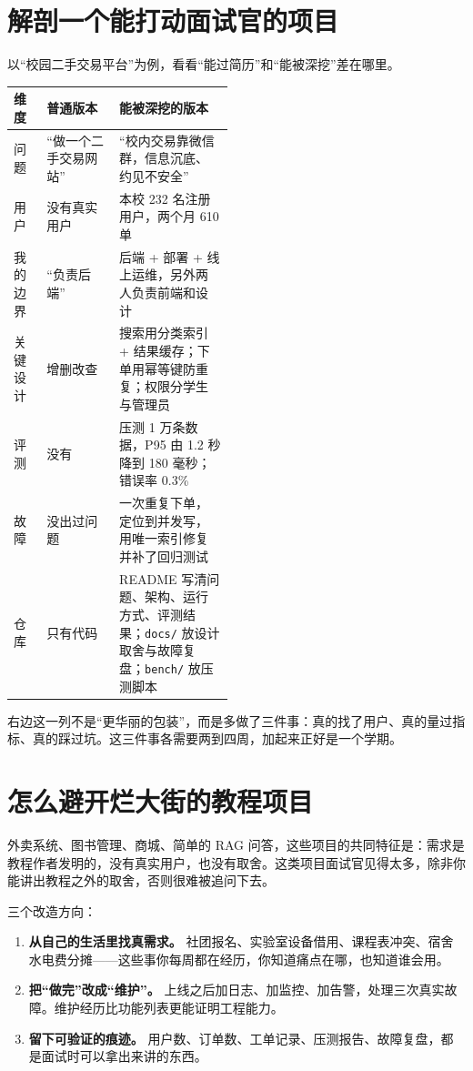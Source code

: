 \documentclass[UTF8,zihao=5,openany]{ctexbook}
\begin{document}
\section{解剖一个能打动面试官的项目}
以“校园二手交易平台”为例，看看“能过简历”和“能被深挖”差在哪里。

\begin{table}[htbp]
\centering\footnotesize
\begin{tabularx}{\linewidth}{p{0.15\linewidth}p{0.33\linewidth}Y}
\toprule
维度 & 普通版本 & 能被深挖的版本 \\
\midrule
问题 & “做一个二手交易网站” & “校内交易靠微信群，信息沉底、约见不安全” \\
用户 & 没有真实用户 & 本校 232 名注册用户，两个月 610 单 \\
我的边界 & “负责后端” & 后端 + 部署 + 线上运维，另外两人负责前端和设计 \\
关键设计 & 增删改查 & 搜索用分类索引 + 结果缓存；下单用幂等键防重复；权限分学生与管理员 \\
评测 & 没有 & 压测 1 万条数据，P95 由 1.2 秒降到 180 毫秒；错误率 0.3\% \\
故障 & 没出过问题 & 一次重复下单，定位到并发写，用唯一索引修复并补了回归测试 \\
仓库 & 只有代码 & README 写清问题、架构、运行方式、评测结果；\texttt{docs/} 放设计取舍与故障复盘；\texttt{bench/} 放压测脚本 \\
\bottomrule
\end{tabularx}
\end{table}

右边这一列不是“更华丽的包装”，而是多做了三件事：真的找了用户、真的量过指标、真的踩过坑。这三件事各需要两到四周，加起来正好是一个学期。

\section{怎么避开烂大街的教程项目}
外卖系统、图书管理、商城、简单的 RAG 问答，这些项目的共同特征是：需求是教程作者发明的，没有真实用户，也没有取舍。这类项目面试官见得太多，除非你能讲出教程之外的取舍，否则很难被追问下去。

三个改造方向：

\begin{enumerate}
\item \textbf{从自己的生活里找真需求。} 社团报名、实验室设备借用、课程表冲突、宿舍水电费分摊——这些事你每周都在经历，你知道痛点在哪，也知道谁会用。
\item \textbf{把“做完”改成“维护”。} 上线之后加日志、加监控、加告警，处理三次真实故障。维护经历比功能列表更能证明工程能力。
\item \textbf{留下可验证的痕迹。} 用户数、订单数、工单记录、压测报告、故障复盘，都是面试时可以拿出来讲的东西。
\end{enumerate}
\end{document}
